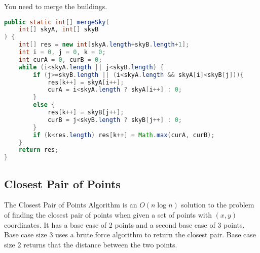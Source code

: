 You need to merge the buildings.

\begin{lstlisting}[language=Java,basicstyle=\tiny]
public static int[] mergeSky(
    int[] skyA, int[] skyB
) {
    int[] res = new int[skyA.length+skyB.length+1];
    int i = 0, j = 0, k = 0;
    int curA = 0, curB = 0;
    while (i<skyA.length || j<skyB.length) {
        if (j>=skyB.length || (i<skyA.length && skyA[i]<skyB[j])){
            res[k++] = skyA[i++];
            curA = i<skyA.length ? skyA[i++] : 0;
        }
        else {
            res[k++] = skyB[j++];
            curB = j<skyB.length ? skyB[j++] : 0;
        }
        if (k<res.length) res[k++] = Math.max(curA, curB);
    }
    return res;
}
\end{lstlisting}

\subsection*{Closest Pair of Points}
The Closest Pair of Points Algorithm is an $O(n\log n)$ solution to the problem of finding the closest pair of points
when given a set of points with $(x,y)$ coordinates. It has a base case of 2 points and a second base case of 3 points.
Base case size 3 uses a brute force algorithm to return the closest pair. Base case size 2 returns that the distance between the two points.


